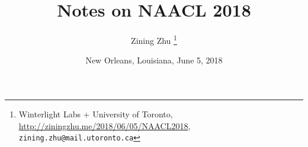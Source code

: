 \documentclass[english]{article}
\begin{document}
\title{Notes on NAACL 2018}

\author{Zining Zhu \footnote{Winterlight Labs + University of Toronto, \url{http://ziningzhu.me/2018/06/05/NAACL2018}, \texttt{zining.zhu@mail.utoronto.ca} }}
\date{New Orleans, Louisiana, June 5, 2018}

\maketitle

\vspace{1cm}

\tableofcontents





%
%





\end{document}

